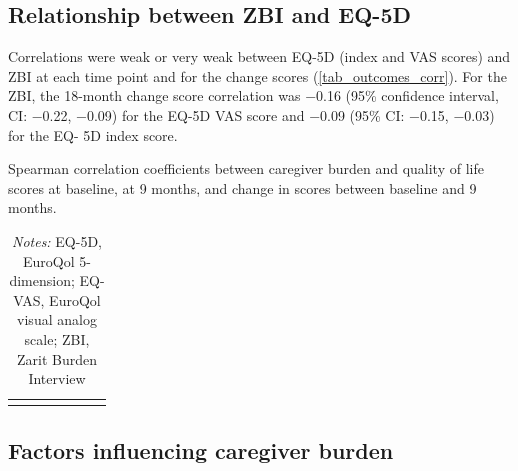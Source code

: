 \documentclass[12pt]{article}
\begin{document}
\subsection*{Relationship between ZBI and EQ-5D}
Correlations were weak or very weak between EQ-5D (index and VAS scores) and ZBI at each time point and for the change scores (\autoref{tab_outcomes_corr}). For the ZBI, the 18-month change score correlation was −0.16 (95\% confidence interval, CI: −0.22, −0.09) for the EQ-5D VAS score and −0.09 (95\% CI: −0.15, −0.03) for the EQ- 5D index score.

\begin{table}[H]
    \centering \singlespacing \small
    \caption{Spearman correlation coefficients between caregiver burden and quality of life scores at baseline, at 9 months, and change in scores between baseline and 9 months.}
    \begin{tabular}{|L{3.6cm}|C{1.7cm}|C{1.4cm}|C{1.7cm}|C{1.4cm}|C{1.7cm}|C{1.4cm}|}
        \hline
    \end{tabular}
    \label{tab_outcomes_corr}
    \caption*{\footnotesize 
                \textit{Notes:} EQ-5D, EuroQol 5-dimension; EQ-VAS, EuroQol visual analog scale; ZBI, Zarit Burden Interview}
\end{table}

\subsection*{Factors influencing caregiver burden}

\end{document}
